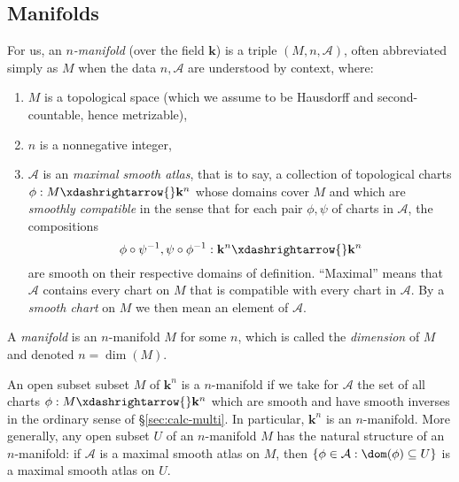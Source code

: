 \documentclass[reqno]{amsart} 
\begin{document}
\subsection{Manifolds}
\label{sec:orgdbe668d}
For us, an \emph{$n$-manifold} (over the field $\mathbf{k}$)
is a triple
$(M,n,\mathcal{A})$, often abbreviated simply as $M$
when the data $n, \mathcal{A}$ are understood by context, where:
\begin{enumerate}
\item $M$ is a topological space (which we assume
   to be Hausdorff and second-countable, hence metrizable),
\item $n$ is a nonnegative integer,
\item $\mathcal{A}$ is an \emph{maximal smooth atlas}, that is to say, a
  collection of topological charts
  $\phi : M \xdashrightarrow{} \mathbf{k}^n$ whose domains cover
  $M$ and which are \emph{smoothly compatible} in the sense that
  for each pair $\phi, \psi$ of charts in $\mathcal{A}$, the
  compositions
  \begin{equation*}
\phi \circ \psi^{-1}, \psi \circ \phi^{-1} : \mathbf{k}^n \xdashrightarrow{}
  \mathbf{k}^n
\end{equation*}
  are smooth on their respective domains of definition.
  ``Maximal'' means that $\mathcal{A}$ contains every chart on $M$ that is compatible with every chart 
  in $\mathcal{A}$.
  By a \emph{smooth chart} on $M$
  we then mean an element of $\mathcal{A}$.
\end{enumerate}
A \emph{manifold} is an $n$-manifold $M$ for some $n$, which is
called the \emph{dimension} of $M$ and denoted $n = \dim(M)$.
\begin{example}
  An open subset subset $M$ of $\mathbf{k}^n$
  is a $n$-manifold
  if we take for $\mathcal{A}$ the set of all
  charts $\phi : M \xdashrightarrow{} \mathbf{k}^n$
  which are smooth and have smooth inverses in 
  the ordinary sense of \S\ref{sec:calc-multi}.
  In particular, $\mathbf{k}^n$ is an $n$-manifold.
  More generally, any open subset $U$ of an $n$-manifold $M$ has the natural structure 
  of an $n$-manifold:
  if $\mathcal{A}$ is a maximal smooth atlas on $M$,
  then $\{ \phi \in \mathcal{A} : \dom(\phi) \subseteq U \}$ is a maximal smooth atlas on $U$.
\end{example}
\end{document}
